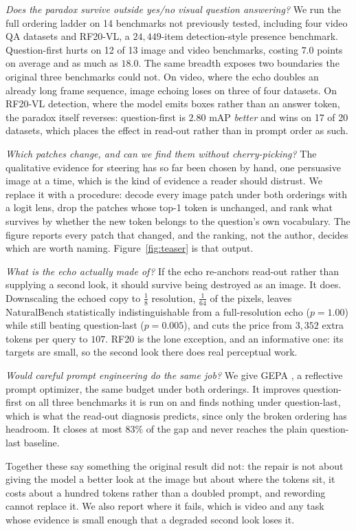 \emph{Does the paradox survive outside yes/no visual question answering?} We run
the full ordering ladder on 14 benchmarks not previously tested, including four
video QA datasets and RF20-VL, a $24{,}449$-item detection-style presence
benchmark. Question-first hurts on 12 of 13 image and video benchmarks, costing
$7.0$ points on average and as much as $18.0$. The same breadth exposes two
boundaries the original three benchmarks could not. On video, where the echo
doubles an already long frame sequence, image echoing loses on three of four
datasets. On RF20-VL detection, where the model emits boxes rather than an answer
token, the paradox itself reverses: question-first is $2.80$ mAP \emph{better} and
wins on 17 of 20 datasets, which places the effect in read-out rather than in
prompt order as such.

\emph{Which patches change, and can we find them without cherry-picking?} The
qualitative evidence for steering has so far been chosen by hand, one persuasive
image at a time, which is the kind of evidence a reader should distrust. We
replace it with a procedure: decode every image patch under both orderings with a
logit lens, drop the patches whose top-1 token is unchanged, and rank what
survives by whether the new token belongs to the question's own vocabulary. The
figure reports every patch that changed, and the ranking, not the author, decides
which are worth naming. Figure~\ref{fig:teaser} is that output.

\emph{What is the echo actually made of?} If the echo re-anchors read-out rather
than supplying a second look, it should survive being destroyed as an image. It
does. Downscaling the echoed copy to $\tfrac{1}{8}$ resolution, $\tfrac{1}{64}$ of
the pixels, leaves NaturalBench statistically indistinguishable from a
full-resolution echo ($p = 1.00$) while still beating question-last
($p = 0.005$), and cuts the price from $3{,}352$ extra tokens per query to $107$.
RF20 is the lone exception, and an informative one: its targets are small, so the
second look there does real perceptual work.

\emph{Would careful prompt engineering do the same job?} We give GEPA
\citep{gepa2025}, a reflective prompt optimizer, the same budget under both
orderings. It improves question-first on all three benchmarks it is run on and
finds nothing under question-last, which is what the read-out diagnosis predicts,
since only the broken ordering has headroom. It closes at most $83\%$ of the gap
and never reaches the plain question-last baseline.

Together these say something the original result did not: the repair is not about
giving the model a better look at the image but about where the tokens sit, it
costs about a hundred tokens rather than a doubled prompt, and rewording cannot
replace it. We also report where it fails, which is video and any task whose
evidence is small enough that a degraded second look loses it.
